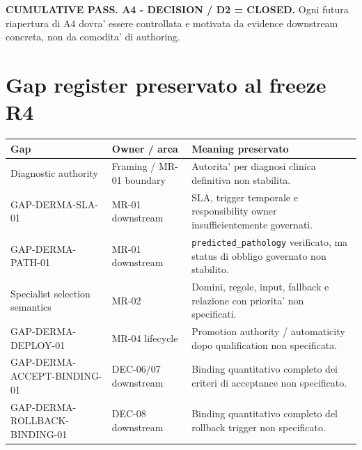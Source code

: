 \documentclass[11pt,a4paper]{article}
\begin{document}
\begin{ddtacore}[title={Project-wide Decision completion disposition}]
\textbf{CUMULATIVE PASS. A4 - DECISION / D2 = CLOSED.} Ogni futura riapertura di A4 dovra' essere controllata e motivata da evidence downstream concreta, non da comodita' di authoring.
\end{ddtacore}

\clearpage
\section{Gap register preservato al freeze R4}
\begin{longtable}{L{45mm}L{30mm}L{68mm}}
\toprule
\textbf{Gap} & \textbf{Owner / area} & \textbf{Meaning preservato} \\
\midrule\endhead
Diagnostic authority & Framing / MR-01 boundary & Autorita' per diagnosi clinica definitiva non stabilita. \\
GAP-DERMA-SLA-01 & MR-01 downstream & SLA, trigger temporale e responsibility owner insufficientemente governati. \\
GAP-DERMA-PATH-01 & MR-01 downstream & \texttt{predicted\_pathology} verificato, ma status di obbligo governato non stabilito. \\
Specialist selection semantics & MR-02 & Domini, regole, input, fallback e relazione con priorita' non specificati. \\
GAP-DERMA-DEPLOY-01 & MR-04 lifecycle & Promotion authority / automaticity dopo qualification non specificata. \\
GAP-DERMA-ACCEPT-BINDING-01 & DEC-06/07 downstream & Binding quantitativo completo dei criteri di acceptance non specificato. \\
GAP-DERMA-ROLLBACK-BINDING-01 & DEC-08 downstream & Binding quantitativo completo del rollback trigger non specificato. \\
\bottomrule
\end{longtable}
\end{document}
